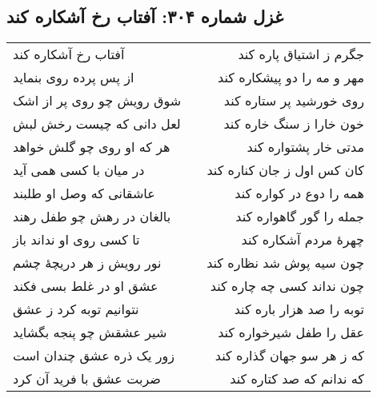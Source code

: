 \begin{center}
\section*{غزل شماره ۳۰۴: آفتاب رخ آشکاره کند}
\label{sec:304}
\begin{longtable}{l p{0.5cm} r}
آفتاب رخ آشکاره کند
&&
جگرم ز اشتیاق پاره کند
\\
از پس پرده روی بنماید
&&
مهر و مه را دو پیشکاره کند
\\
شوق رویش چو روی پر از اشک
&&
روی خورشید پر ستاره کند
\\
لعل دانی که چیست رخش لبش
&&
خون خارا ز سنگ خاره کند
\\
هر که او روی چو گلش خواهد
&&
مدتی خار پشتواره کند
\\
در میان با کسی همی آید
&&
کان کس اول ز جان کناره کند
\\
عاشقانی که وصل او طلبند
&&
همه را دوع در کواره کند
\\
بالغان در رهش چو طفل رهند
&&
جمله را گور گاهواره کند
\\
تا کسی روی او نداند باز
&&
چهرهٔ مردم آشکاره کند
\\
نور رویش ز هر دریچهٔ چشم
&&
چون سیه پوش شد نظاره کند
\\
عشق او در غلط بسی فکند
&&
چون نداند کسی چه چاره کند
\\
نتوانیم توبه کرد ز عشق
&&
توبه را صد هزار باره کند
\\
شیر عشقش چو پنجه بگشاید
&&
عقل را طفل شیرخواره کند
\\
زور یک ذره عشق چندان است
&&
که ز هر سو جهان گذاره کند
\\
ضربت عشق با فرید آن کرد
&&
که ندانم که صد کتاره کند
\\
\end{longtable}
\end{center}
